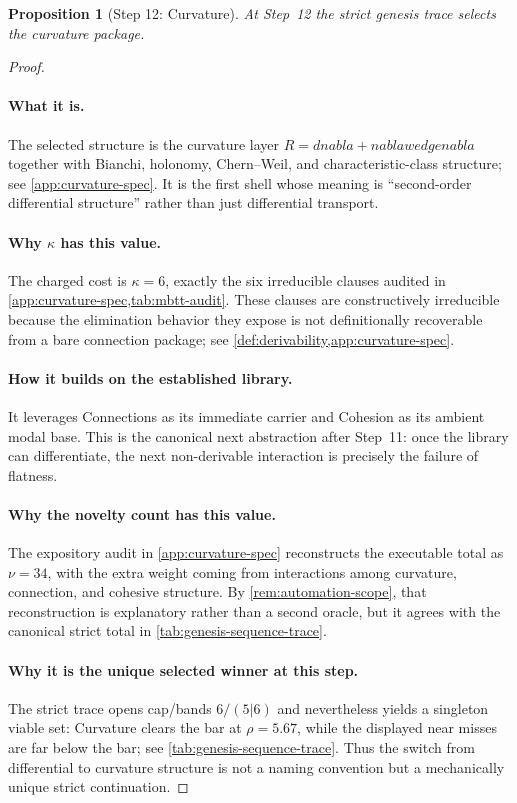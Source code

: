 \documentclass[11pt,a4paper]{article}
\def\nabla{nabla}%
\def\wedge{wedge}%
\theoremstyle{plain}
\newtheorem{proposition}[theorem]{Proposition}
\theoremstyle{definition}
\theoremstyle{remark}
\begin{document}
\begin{proposition}[Step 12: Curvature]
\label{prop:genesis-step12}
At Step~12 the strict genesis trace selects the curvature package.
\end{proposition}

\begin{proof}
\paragraph{What it is.}
The selected structure is the curvature layer
$R=d\nabla+\nabla\wedge\nabla$ together with Bianchi, holonomy, Chern--Weil, and
characteristic-class structure; see \cref{app:curvature-spec}.
It is the first shell whose meaning is ``second-order differential structure''
rather than just differential transport.

\paragraph{Why $\kappa$ has this value.}
The charged cost is $\kappa=6$, exactly the six irreducible clauses audited in
\cref{app:curvature-spec,tab:mbtt-audit}.
These clauses are constructively irreducible because the elimination behavior
they expose is not definitionally recoverable from a bare connection package;
see \cref{def:derivability,app:curvature-spec}.

\paragraph{How it builds on the established library.}
It leverages Connections as its immediate carrier and Cohesion as its ambient
modal base.
This is the canonical next abstraction after Step~11: once the library can
differentiate, the next non-derivable interaction is precisely the failure of
flatness.

\paragraph{Why the novelty count has this value.}
The expository audit in \cref{app:curvature-spec} reconstructs the executable
total as $\nu=34$, with the extra weight coming from interactions among
curvature, connection, and cohesive structure.
By \cref{rem:automation-scope}, that reconstruction is explanatory rather than a
second oracle, but it agrees with the canonical strict total in
\cref{tab:genesis-sequence-trace}.

\paragraph{Why it is the unique selected winner at this step.}
The strict trace opens cap/bands $6/(5|6)$ and nevertheless yields a singleton
viable set: Curvature clears the bar at $\rho=5.67$, while the displayed near
misses are far below the bar; see \cref{tab:genesis-sequence-trace}.
Thus the switch from differential to curvature structure is not a naming
convention but a mechanically unique strict continuation.
\end{proof}
\end{document}
